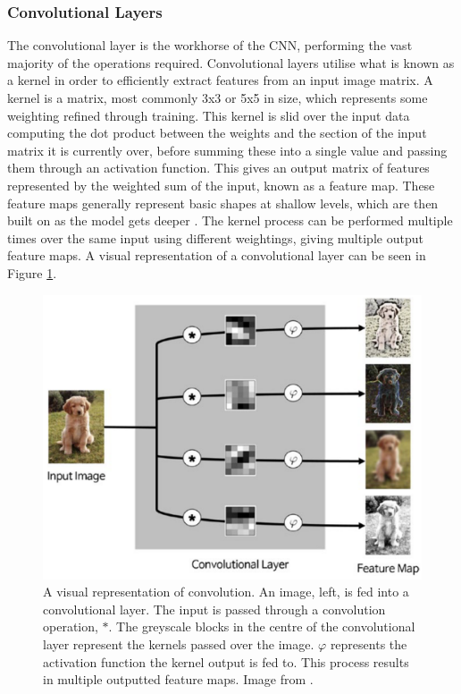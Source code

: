 \subsubsection{Convolutional Layers}\label{ch:Background,sec:CNN,sub:CNN,subsub:convolution}

The convolutional layer is the workhorse of the CNN, performing the vast majority of the operations required. Convolutional layers utilise what is known as a kernel in order to efficiently extract features from an input image matrix. A kernel is a matrix, most commonly 3x3 or 5x5 in size, which represents some weighting refined through training. This kernel is slid over the input data computing the dot product between the weights and the section of the input matrix it is currently over, before summing these into a single value and passing them through an activation function. This gives an output matrix of features represented by the weighted sum of the input, known as a feature map. These feature maps generally represent basic shapes at shallow levels, which are then built on as the model gets deeper \cite{kim_convolutional_2017}. The kernel process can be performed multiple times over the same input using different weightings, giving multiple output feature maps. A visual representation of a convolutional layer can be seen in Figure \ref{fig:convolution}.

\begin{figure}
	\begin{center}
		\includegraphics[width=0.6\linewidth]{Chapter2/figs/convolution.png}
	\end{center}
	\caption[A visual representation of convolution.]{A visual representation of convolution. An image, left, is fed into a convolutional layer. The input is passed through a convolution operation, $*$. The greyscale blocks in the centre of the convolutional layer represent the kernels passed over the image. $\varphi$ represents the activation function the kernel output is fed to. This process results in multiple outputted feature maps. Image from \cite{kim_convolutional_2017}.}
	\label{fig:convolution}
\end{figure}

